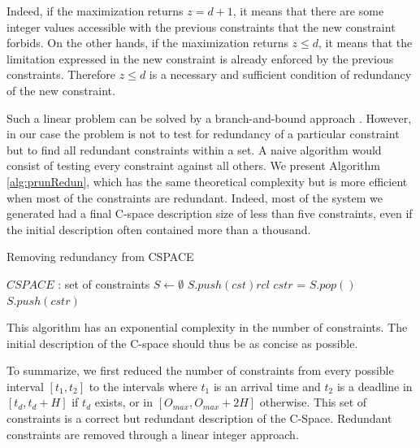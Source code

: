 \documentclass[conference]{IEEEtran}
\begin{document}
Indeed, if the maximization returns $z=d+1$, it means that there are some integer values accessible with the previous constraints that the new constraint forbids. On the other hands, if the maximization returns $z \leq d$, it means that the limitation expressed in the new constraint is already enforced by the previous constraints. Therefore $z \leq d$ is a necessary and sufficient condition of redundancy of the new constraint.

Such a linear problem can be solved by a branch-and-bound approach \cite{nemhauser1988integer}. However, in our case the problem is not to test for redundancy of a particular constraint but to find all redundant constraints within a set. A naive algorithm would consist of testing every constraint against all others. We present Algorithm \ref{alg:prunRedun}, which has the same theoretical complexity but is more efficient when most of the constraints are redundant. Indeed, most of the system we generated had a final C-space description size of less than five constraints, even if the initial description often contained more than a thousand.

\begin{algorithm}
\caption{Removing redundancy from CSPACE}
\label{alg:prunRedun}
  \begin{algorithmic}[1]
    \STATE $CSPACE$ : set of constraints
    \STATE $S \leftarrow \emptyset$
    \STATE {}
        \STATE $S.push(cst)rcl$
      \ENDIF
    \ENDFOR
    \STATE {}
      \STATE $cstr$ = $S.pop()$
        \STATE $S.push(cstr)$
      \ENDIF
    \ENDFOR
  \end{algorithmic}
\end{algorithm}

This algorithm
has an exponential complexity in the number of constraints. The initial description
of the C-space should thus be as concise as possible.

To summarize, we first reduced the number of constraints from every possible
interval $[t_1, t_2]$ to the intervals where $t_1$ is an arrival time and
$t_2$ is a deadline in $[t_d, t_d + H]$ if $t_d$ exists, or in
$[O_{max}, O_{max} + 2H]$ otherwise. This set of constraints is a
correct but redundant description of the C-Space. Redundant
constraints are removed through a linear integer approach.
\end{document}

